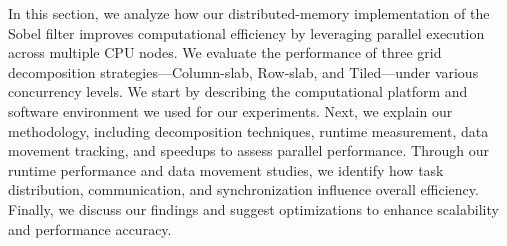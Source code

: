 
In this section, we analyze how our distributed-memory implementation of the Sobel filter improves computational efficiency by leveraging parallel execution across multiple CPU nodes. We evaluate the performance of three grid decomposition strategies—Column-slab, Row-slab, and Tiled—under various concurrency levels. We start by describing the computational platform and software environment we used for our experiments. Next, we explain our methodology, including decomposition techniques, runtime measurement, data movement tracking, and speedups to assess parallel performance. Through our runtime performance and data movement studies, we identify how task distribution, communication, and synchronization influence overall efficiency. Finally, we discuss our findings and suggest optimizations to enhance scalability and performance accuracy.